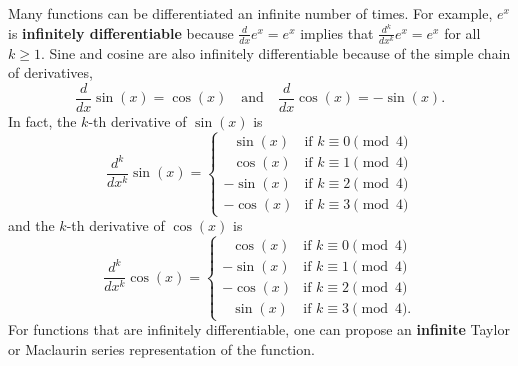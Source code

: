 Many functions can be differentiated an infinite number of times. For example, $e^x$ is \textbf{infinitely differentiable} because $\frac{d}{dx} e^x = e^x$ implies that  $\frac{d^k}{dx^k} e^x = e^x$ for all $k\ge 1$. Sine and cosine are also infinitely differentiable because of the simple chain of derivatives,
$$\frac{d}{dx} \sin(x) = \cos(x) \quad \text{and} \quad \frac{d}{dx} \cos(x) = -\sin(x).  $$
In fact, the \(k\)-th derivative of \(\sin(x)\) is
\[
\frac{d^k}{dx^k} \sin(x) = 
\begin{cases} 
~~~ \sin(x) & \text{if } k \equiv 0 \pmod{4} \\
~~~ \cos(x) & \text{if } k \equiv 1 \pmod{4} \\
-\sin(x) & \text{if } k \equiv 2 \pmod{4} \\
-\cos(x) & \text{if } k \equiv 3 \pmod{4}
\end{cases}
\]
and the \(k\)-th derivative of \(\cos(x)\) is
\[
\frac{d^k}{dx^k} \cos(x) = 
\begin{cases} 
~~~ \cos(x) & \text{if } k \equiv 0 \pmod{4} \\
-\sin(x) & \text{if } k \equiv 1 \pmod{4} \\
-\cos(x) & \text{if } k \equiv 2 \pmod{4} \\
~~~ \sin(x) & \text{if } k \equiv 3 \pmod{4}.
\end{cases}
\]
For functions that are infinitely differentiable, one can propose an \textbf{infinite} Taylor or Maclaurin series representation of the function.  \\

